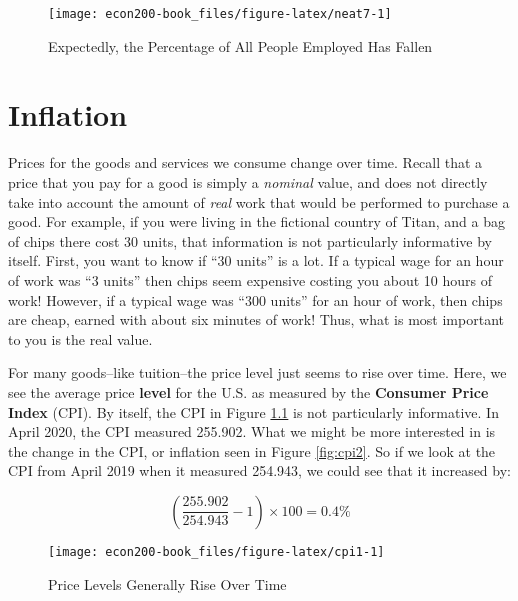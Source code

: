 \documentclass[
]{book}
\begin{document}
\begin{figure}

{\centering \texttt{[image: econ200-book\_files/figure-latex/neat7-1]} 

}

\caption{Expectedly, the Percentage of All People Employed Has Fallen}\label{fig:neat7}
\end{figure}

\hypertarget{inflation}{%
\chapter{Inflation}\label{inflation}}

Prices for the goods and services we consume change over time. Recall that a price that you pay for a good is simply a \emph{nominal} value, and does not directly take into account the amount of \emph{real} work that would be performed to purchase a good. For example, if you were living in the fictional country of Titan, and a bag of chips there cost 30 units, that information is not particularly informative by itself. First, you want to know if ``30 units'' is a lot. If a typical wage for an hour of work was ``3 units'' then chips seem expensive costing you about 10 hours of work! However, if a typical wage was ``300 units'' for an hour of work, then chips are cheap, earned with about six minutes of work! Thus, what is most important to you is the real value.

For many goods--like tuition--the price level just seems to rise over time. Here, we see the average price \textbf{level} for the U.S. as measured by the \textbf{Consumer Price Index} (CPI). By itself, the CPI in Figure \ref{fig:cpi1} is not particularly informative. In April 2020, the CPI measured 255.902. What we might be more interested in is the change in the CPI, or inflation seen in Figure \ref{fig:cpi2}. So if we look at the CPI from April 2019 when it measured 254.943, we could see that it increased by:

\[\left(\frac{255.902}{254.943} - 1\right)\times 100 = 0.4\%\]

\begin{figure}

{\centering \texttt{[image: econ200-book\_files/figure-latex/cpi1-1]} 

}

\caption{Price Levels Generally Rise Over Time}\label{fig:cpi1}
\end{figure}
\end{document}
